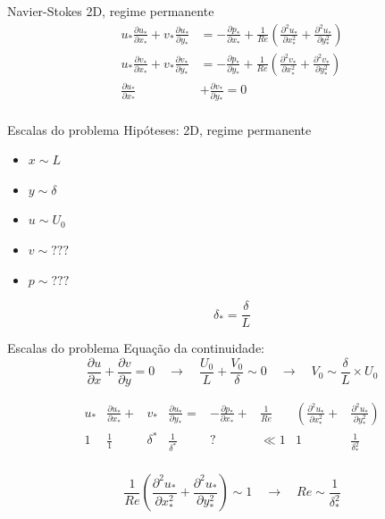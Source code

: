\documentclass{beamer}
\newcommand{\lra}{\ensuremath{\longrightarrow}}
\newcommand{\qrq}{\ensuremath{\quad\lra\quad}}
\begin{document}
\begin{frame}{Navier-Stokes 2D, regime permanente}
  \begin{align*}
    u_*\frac{\partial u_*}{\partial x_*} + v_*\frac{\partial u_*}{\partial y_*} &= 
    -\frac{\partial p_*}{\partial x_*} + \frac{1}{Re} \left( \frac{\partial^2 u_*}{\partial x_*^2} + \frac{\partial^2 u_*}{\partial y_*^2}\right) \\
    u_*\frac{\partial v_*}{\partial x_*} + v_*\frac{\partial v_*}{\partial y_*} &= 
    -\frac{\partial p_*}{\partial y_*} + \frac{1}{Re} \left( \frac{\partial^2 v_*}{\partial x_*^2} + \frac{\partial^2 v_*}{\partial y_*^2}\right) \\
    \frac{\partial u_*}{\partial x_*} &+ \frac{\partial v_*}{\partial y_*} = 0\\
  \end{align*}

\end{frame}


\begin{frame}{Escalas do problema}
  Hipóteses: 2D, regime permanente
  \begin{itemize}
  \item $x \sim L$
  \item $y \sim \delta$
  \item $u \sim U_0$
  \item $v \sim ???$
  \item $p \sim ???$
  \end{itemize}

  \[
  \delta_* = \frac{\delta}{L}
  \]
  
\end{frame}

\begin{frame}{Escalas do problema}
  Equação da continuidade:
  \[
  \frac{\partial u}{\partial x} + \frac{\partial v}{\partial y} = 0 \qrq \frac{U_0}{L} + \frac{V_0}{\delta} \sim 0 \qrq V_0 \sim \frac{\delta}{L} \times U_0
  \]

\[
\begin{matrix}
 u_*&\frac{\partial u_*}{\partial x_*} + &v_*&\frac{\partial u_*}{\partial y_*} =& 
-\frac{\partial p_*}{\partial x_*} + &\frac{1}{Re} &\left( \frac{\partial^2 u_*}{\partial x_*^2}\right. +& \left.\frac{\partial^2 u_*}{\partial y_*^2}\right) \\
1 & \frac{1}{1} & \delta^* & \frac{1}{\delta^*} & ? & \ll 1 & 1 & \frac{1}{\delta_*^2} \\
\end{matrix}
\]

\[
\frac{1}{Re} \left( \frac{\partial^2 u_*}{\partial x_*^2}\right. + \left.\frac{\partial^2 u_*}{\partial y_*^2}\right)\sim 1\qrq Re \sim \frac{1}{\delta_*^2}
\]

\end{frame}
\end{document}
